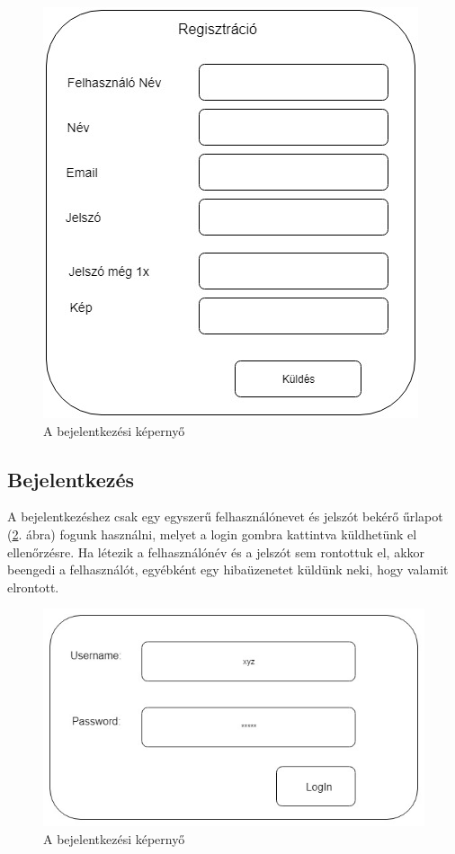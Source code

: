 \begin{figure}
\centering
\includegraphics[scale=0.5]{kepek/registration.jpg}
\caption{A bejelentkezési képernyő}
\label{fig:registration}
\end{figure}

\subsection{Bejelentkezés}
A bejelentkezéshez csak egy egyszerű felhasználónevet és jelszót bekérő űrlapot (\ref{fig:login}. ábra) fogunk használni, melyet a login gombra kattintva küldhetünk el ellenőrzésre. Ha létezik a felhasználónév és a jelszót sem rontottuk el, akkor beengedi a felhasználót, egyébként egy hibaüzenetet küldünk neki, hogy valamit elrontott.

\begin{figure}
\centering
\includegraphics[scale=0.5]{kepek/login.jpg}
\caption{A bejelentkezési képernyő}
\label{fig:login}
\end{figure}

